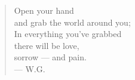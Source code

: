 \begin{quote}
Open your hand \\
and grab the world around you; \\
In everything you've grabbed \\
there will be love, \\
sorrow --- and pain. \\
--- W.G.
\end{quote}

